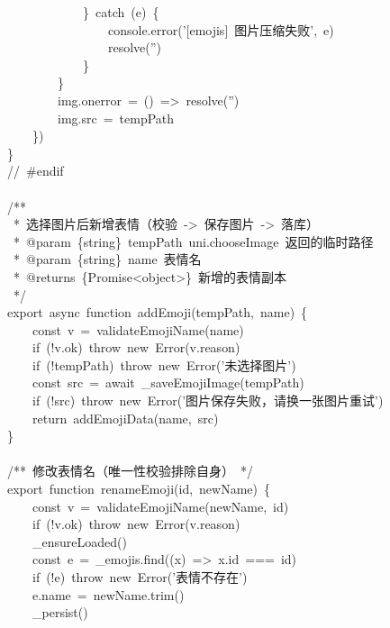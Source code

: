 \documentclass[a4paper,10pt]{article}
\begin{document}
{\ttfamily\footnotesize\raggedright
~~~~~~~~~~~~\}~catch~(e)~\{\\
~~~~~~~~~~~~~~~~console.error('[emojis]~图片压缩失败',~e)\\
~~~~~~~~~~~~~~~~resolve('')\\
~~~~~~~~~~~~\}\\
~~~~~~~~\}\\
~~~~~~~~img.onerror~=~()~=>~resolve('')\\
~~~~~~~~img.src~=~tempPath\\
~~~~\})\\
\}\\
//~\#endif\\
\mbox{}\\
/**\\
~*~选择图片后新增表情（校验~->~保存图片~->~落库）\\
~*~@param~\{string\}~tempPath~uni.chooseImage~返回的临时路径\\
~*~@param~\{string\}~name~表情名\\
~*~@returns~\{Promise<object>\}~新增的表情副本\\
~*/\\
export~async~function~addEmoji(tempPath,~name)~\{\\
~~~~const~v~=~validateEmojiName(name)\\
~~~~if~(!v.ok)~throw~new~Error(v.reason)\\
~~~~if~(!tempPath)~throw~new~Error('未选择图片')\\
~~~~const~src~=~await~\_saveEmojiImage(tempPath)\\
~~~~if~(!src)~throw~new~Error('图片保存失败，请换一张图片重试')\\
~~~~return~addEmojiData(name,~src)\\
\}\\
\mbox{}\\
/**~修改表情名（唯一性校验排除自身）~*/\\
export~function~renameEmoji(id,~newName)~\{\\
~~~~const~v~=~validateEmojiName(newName,~id)\\
~~~~if~(!v.ok)~throw~new~Error(v.reason)\\
~~~~\_ensureLoaded()\\
~~~~const~e~=~\_emojis.find((x)~=>~x.id~===~id)\\
~~~~if~(!e)~throw~new~Error('表情不存在')\\
~~~~e.name~=~newName.trim()\\
~~~~\_persist()\\
}
\end{document}
